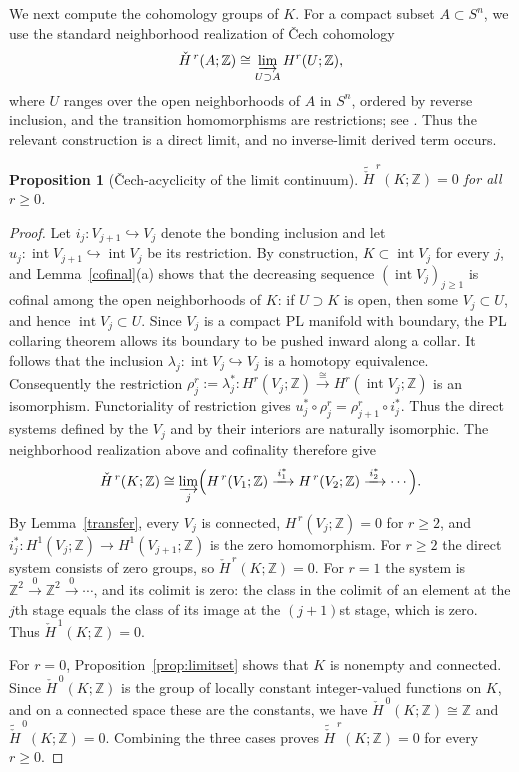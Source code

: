 \documentclass[12pt,oneside,a4paper]{article}
\newtheorem{proposition}[definition]{Proposition}
\theoremstyle{mytheorem}
\theoremstyle{remark}
\theoremstyle{definition}
\begin{document}
We next compute the cohomology groups of $K$.  For a compact subset
$A\subset S^n$, we use the standard neighborhood realization of \v{C}ech
cohomology
\[
 \check H^{\,r}(A;\mathbb Z)
 \cong
 \varinjlim_{U\supset A}H^r(U;\mathbb Z),
\]
where $U$ ranges over the open neighborhoods of $A$ in $S^n$, ordered by
reverse inclusion, and the transition homomorphisms are restrictions; see
\cite[p.~257]{zbMATH02103273}.  Thus the relevant construction is a
direct limit, and no inverse-limit derived term occurs.

\begin{proposition}[\v{C}ech-acyclicity of the limit continuum]\label{prop:cech}
$\widetilde{\check H}^{\,r}(K;\mathbb{Z})=0$ for all $r\ge0$.
\end{proposition}

\begin{proof}
Let $i_j:V_{j+1}\hookrightarrow V_j$ denote the bonding inclusion and
let $u_j:\operatorname{int}V_{j+1}\hookrightarrow
\operatorname{int}V_j$ be its restriction.  By construction,
$K\subset\operatorname{int}V_j$ for every $j$, and
Lemma~\ref{cofinal}\textup{(a)} shows that the decreasing sequence
$(\operatorname{int}V_j)_{j\geq1}$ is cofinal among the open neighborhoods
of $K$: if $U\supset K$ is open, then some $V_j\subset U$, and hence
$\operatorname{int}V_j\subset U$.  Since $V_j$ is a compact PL manifold
with boundary, the PL collaring theorem
\cite[Corollary~2.5]{zbMATH01714503} allows its boundary to be pushed
inward along a collar.  It follows that the inclusion
$\lambda_j:\operatorname{int}V_j\hookrightarrow V_j$ is a homotopy
equivalence.  Consequently the restriction
\(\rho_j^r:=\lambda_j^*:
H^r(V_j;\mathbb Z)\xrightarrow{\ \cong\ }
H^r(\operatorname{int}V_j;\mathbb Z)\)
is an isomorphism.  Functoriality of restriction gives
\(u_j^*\circ\rho_j^r=\rho_{j+1}^r\circ i_j^*\).
Thus the direct systems defined by the $V_j$ and by their interiors are
naturally isomorphic.  The neighborhood realization above and cofinality
therefore give
\[
\check H^{\,r}(K;\mathbb Z)
\cong
\varinjlim_j\Bigl(
H^{\,r}(V_1;\mathbb Z)\xrightarrow{\,i_1^*\,}
H^{\,r}(V_2;\mathbb Z)\xrightarrow{\,i_2^*\,}\cdots\Bigr).
\]
By Lemma~\ref{transfer}, every $V_j$ is connected, $H^{\,r}(V_j;\mathbb Z)=0$ for $r\geq2$, and $i_j^*:H^1(V_j;\mathbb Z)\to H^1(V_{j+1};\mathbb Z)$ is the zero
homomorphism. For $r\geq2$ the direct system consists of zero groups, so
$\check H^{\,r}(K;\mathbb Z)=0$.  For $r=1$ the system is
$\mathbb Z^2\xrightarrow{0}\mathbb Z^2\xrightarrow{0}\cdots$, and its
colimit is zero: the class in the colimit of an element at the $j$th stage
equals the class of its image at the $(j+1)$st stage, which is zero.  Thus
$\check H^{\,1}(K;\mathbb Z)=0$.

For $r=0$, Proposition~\ref{prop:limitset} shows that $K$ is nonempty and
connected.  Since $\check H^{\,0}(K;\mathbb Z)$ is the group of locally
constant integer-valued functions on $K$, and on a connected space these
are the constants, we have $\check H^{\,0}(K;\mathbb Z)\cong\mathbb Z$
and $\widetilde{\check H}^{\,0}(K;\mathbb Z)=0$.  Combining the three
cases proves $\widetilde{\check H}^{\,r}(K;\mathbb Z)=0$ for every
$r\geq0$.
\end{proof}
\end{document}
